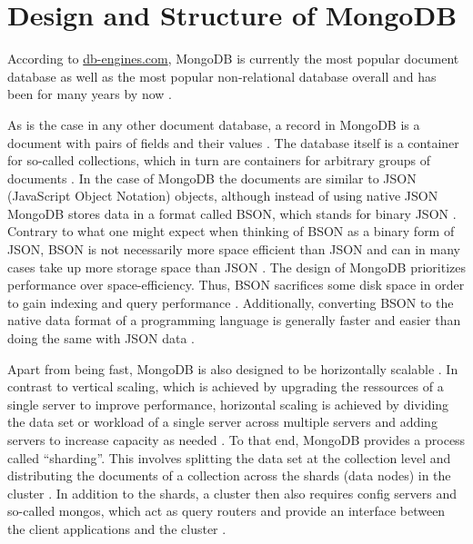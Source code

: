 
\section{Design and Structure of MongoDB}
According to \url{db-engines.com}, MongoDB is currently the most popular document database as well as the most popular non-relational database overall
and has been for many years by now \parencite{DB-Engines-Ranking, DB-Engines-Trend}. 

As is the case in any other document database, a record in MongoDB is a document with pairs of fields and their values \parencite[p. 90]{chauhan2019review}. 
The database itself is a container for so-called collections, which in turn are containers for arbitrary groups of documents \parencite[p. 90]{chauhan2019review}.
In the case of MongoDB the documents are similar to JSON (JavaScript Object Notation) objects, although instead of using native JSON MongoDB stores data 
in a format called BSON, which stands for binary JSON \parencites[p. 4]{Membrey2014}[p. 90]{chauhan2019review}. Contrary to what one might expect when 
thinking of BSON as a binary form of JSON, BSON is not necessarily more space efficient than JSON and can in many cases take up more storage space than JSON \parencite[p. 11]{Membrey2014}. 
The design of MongoDB prioritizes performance over space-efficiency. Thus, BSON sacrifices some disk space in order to gain indexing and query performance \parencite[p. 11]{Membrey2014}.
Additionally, converting BSON to the native data format of a programming language is generally faster and easier than doing the same with JSON data \parencite[p. 11]{Membrey2014}. 

Apart from being fast, MongoDB is also designed to be horizontally scalable \parencite[p. 2, 6-7]{Membrey2014}. In contrast to vertical scaling, which is achieved by upgrading the ressources
of a single server to improve performance, horizontal scaling is achieved by dividing the data set or workload of a single server across multiple servers and adding
servers to increase capacity as needed \parencite{Mongo-Sharding}. To that end, MongoDB provides a process called \enquote{sharding}. This involves splitting the 
data set at the collection level and distributing the documents of a collection across the shards (data nodes) in the cluster \parencites{Mongo-Sharding}[p. 7]{Membrey2014}.
In addition to the shards, a cluster then also requires config servers and so-called mongos, which act as query routers and provide an interface between the 
client applications and the cluster \parencite{Mongo-Sharding}.

